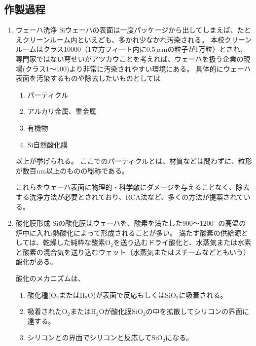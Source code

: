 \documentclass[11pt]{jarticle}
\begin{document}
	\subsection{作製過程}
		\begin{enumerate}
			\item ウェーハ洗浄
				Siウェーハの表面は一度パッケージから出してしまえば、たとえクリーンルーム内といえども、多かれ少なかれ汚染される。
				本校クリーンルームはクラス10000（1立方フィート内に$0.5\,\mu$\,mの粒子が1万粒）とされ、専門家ではない萼せいがアツカウことを考えれば、ウェーハを扱う企業の現場(クラス1〜100)より非常に汚染されやすい環境にある。
				具体的にウェーハ表面を汚染するものや除去したいものとしては

				\begin{enumerate}
					\item パーティクル\\
					\item アルカリ金属、重金属\\
					\item 有機物\\
					\item Si自然酸化膜\\
				\end{enumerate}

				以上が挙げられる。
				ここでのパーティクルとは、材質などは問わずに、粒形が数百nm以上のものの総称である。

				これらをウェーハ表面に物理的・科学敵にダメージを与えることなく、除去する洗浄方法が必要とされており、RCA法など、多くの方法が提案されている。

			\item 酸化膜形成
				Siの酸化膜はウェーハを、酸素を満たした$900〜1200^\circ$ の高温の炉中に入れr熱酸化によって形成されることが多い。
				満たす酸素の供給源としては、乾燥した純粋な酸素$\mathrm{O}_{2}$を送り込むドライ酸化と、水蒸気または水素と酸素の混合気を送り込むウェット（水蒸気またはスチームなどともいう）酸化がある。

				酸化のメカニズムは、

					\begin{enumerate}
						\item 酸化種($\mathrm{O}_{2}$または$\mathrm{H}_{2}\mathrm{O}$)が表面で反応もしくは$\mathrm{SiO}_{2}$に吸着される。\\
						\item 吸着された$\mathrm{O}_{2}$または$\mathrm{H}_{2}\mathrm{O}$が酸化膜$\mathrm{SiO}_{2}$の中を拡散してシリコンの界面に達する。\\
						\item シリコンとの界面でシリコンと反応して$\mathrm{SiO}_{2}$になる。\\
					\end{enumerate}
				

\end{enumerate}
\end{document}
